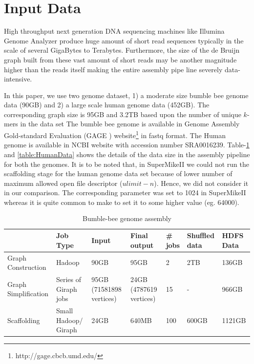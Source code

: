 \documentclass[conference]{IEEEtran}
\begin{document}
\section {Input Data} \label{InputData}
High throughput next generation DNA sequencing machines like Illumina Genome Analyzer produce huge amount of short read sequences typically in the scale of several GigaBytes to Terabytes.
Furthermore, the size of the de Bruijn graph built from these vast amount of short reads may be another magnitude higher than the reads itself making the entire assembly pipe line severely data-intensive.

In this paper, we use two genome dataset, 1) a moderate size bumble bee genome data (90GB) and 2) a large scale human genome data (452GB).
The corresponding graph size is 95GB and 3.2TB based upon the number of unique $k$-mers in the data set
The bumble bee genome is available in Genome Assembly Gold-standard Evaluation (GAGE \cite{bio:gage}) website\footnote{http://gage.cbcb.umd.edu/} in fastq format.
The Human genome is available in NCBI website with accession number SRA0016239.
Table-\ref{table:BumbleBeeData} and \ref{table:HumanData} shows the details of the data size in the assembly pipeline for both the genomes.
It is to be noted that, in SuperMikeII we could not run the scaffolding stage for the human genome data set because of lower number of maximum allowed open file descriptor ($ulimit -n$). Hence, we did not consider it in our comparison. The corresponding parameter was set to 1024 in SuperMikeII whereas it is quite common to make to set it to some higher value (eg. 64000).

\begin{table}
\begin{center}
    \begin{tabular}{ |p{1.1cm} | p{0.8cm} | p{1.1cm} | p{0.8cm} | p{0.8cm} | p{0.8cm} | p{0.8cm}|} \hline
    & Job Type & Input & Final output & \# jobs & Shuffled data & HDFS Data \\ \hline
    Graph Construction & Hadoop & 90GB & 95GB & 2 & 2TB & 136GB \\ \hline
    Graph Simplification & Series of Giraph jobs & 95GB (71581898 vertices) & 24GB (4787619 vertices) & 15 & - & 966GB \\ \hline
    Scaffolding & Small Hadoop/ Giraph & 24GB & 640MB & 100 & 600GB & 1121GB \\ \hline    
    \end{tabular}
    \caption{Bumble-bee genome assembly}
	\label{table:BumbleBeeData}
\end{center}
\end{table}
\end{document}
